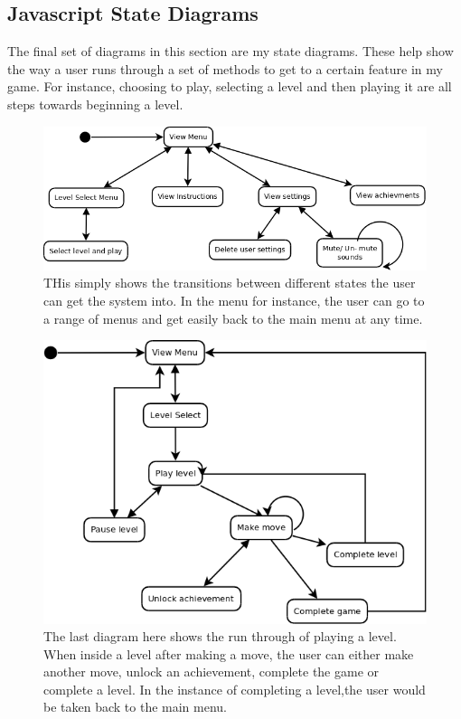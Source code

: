 \documentclass[a4paper]{article}
\begin{document}
\subsection{Javascript State Diagrams}
The final set of diagrams in this section are my state diagrams. These help show
the way a user runs through a set of methods to get to a certain feature in my
game. For instance, choosing to play, selecting a level and then playing it are
all steps towards beginning a level.
\begin{figure}[!ht]
   \centering
   \includegraphics[scale=0.5]{state1.png}
  \caption{THis simply shows the transitions between different states the user
can get the system into. In the menu for instance, the user can go to a range of
menus and get easily back to the main menu at any time. }
   \end{figure}
   \begin{figure}[!ht]
   \centering
   \includegraphics[scale=0.5]{state2.png}
  \caption{The last diagram here shows the run through of playing a level. When
inside a level after making a move, the user can either make another move,
unlock an achievement, complete the game or complete a level. In the instance of
completing a level,the user would be taken back to the main menu.}
   \end{figure}
    \clearpage
\end{document}

